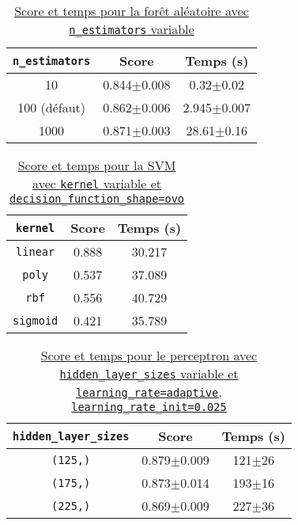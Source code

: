 \documentclass[11pt]{rapport-tp-ia}
\begin{document}
\begin{table}[bht!]
	\centering
	\caption{\hyperref[fig:paramsForest]{\footnotesize Score et temps pour la forêt aléatoire avec \texttt{n\_estimators} variable}}
	\begin{tabular}{|c|c|c|}
		\hline
		\texttt{n\_estimators} & Score           & Temps (s)       \\
		\hline\hline
		10                     & 0.844$\pm$0.008 & 0.32$\pm$0.02   \\
		100 (défaut)          & 0.862$\pm$0.006 & 2.945$\pm$0.007 \\
		1000                   & 0.871$\pm$0.003 & 28.61$\pm$0.16  \\
		\hline
	\end{tabular}
	
	\label{tab:foret}
\end{table}

\begin{table}[bht!]
	\centering
	\caption{\hyperref[fig:paramsSvm]{\footnotesize Score et temps pour la SVM avec \texttt{kernel} variable et \texttt{decision\_function\_shape=ovo}}}
	\begin{tabular}{|c|c|c|}
		\hline
		\texttt{kernel}  & Score & Temps (s) \\
		\hline\hline
		\texttt{linear}  & 0.888 & 30.217    \\
		\texttt{poly}    & 0.537 & 37.089    \\
		\texttt{rbf}     & 0.556 & 40.729    \\
		\texttt{sigmoid} & 0.421 & 35.789    \\
		\hline
	\end{tabular}
	
	\label{tab:svm}
\end{table}

\begin{table}[bht!]
	\centering
	\caption{\hyperref[fig:paramsPerceptron]{\footnotesize Score et temps pour le perceptron avec \texttt{hidden\_layer\_sizes} variable et \texttt{learning\_rate=adaptive}, \texttt{learning\_rate\_init=0.025}}}
	\begin{tabular}{|c|c|c|}
		\hline
		\texttt{hidden\_layer\_sizes} & Score           & Temps (s)  \\
		\hline\hline
		\texttt{(125,)}               & 0.879$\pm$0.009 & 121$\pm$26 \\
		\texttt{(175,)}               & 0.873$\pm$0.014 & 193$\pm$16 \\
		\texttt{(225,)}               & 0.869$\pm$0.009 & 227$\pm$36 \\
		\hline
	\end{tabular}
	
	\label{tab:perceptron}
\end{table}
\end{document}
